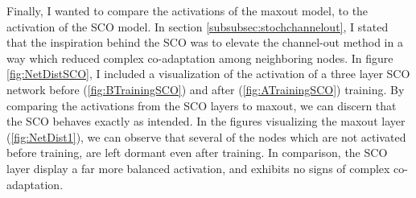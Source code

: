 Finally, I wanted to compare the activations of the maxout model, to the activation of the \ac{SCO} model. In section \ref{subsubsec:stochchannelout},
I stated that the inspiration behind the \ac{SCO} was to elevate the channel-out method in a way which reduced complex co-adaptation among neighboring
nodes. In figure \ref{fig:NetDistSCO}, I included a visualization of the activation of a three layer \ac{SCO} network before (\ref{fig:BTrainingSCO}) 
and after (\ref{fig:ATrainingSCO}) training. By comparing the activations from the \ac{SCO} layers to maxout, we can discern that the \ac{SCO} behaves
exactly as intended. In the figures visualizing the maxout layer (\ref{fig:NetDist1}), we can observe that several of the nodes which are not activated 
before training, are left dormant even after training. In comparison, the \ac{SCO} layer display a far more balanced activation, and exhibits no signs 
of complex co-adaptation. 
